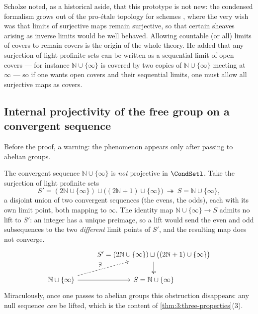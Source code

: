 \begin{remark}
\label{rmk:3:proetale-origin}
Scholze noted, as a historical aside, that this prototype is not new: the
condensed formalism grows out of the pro-\'etale topology for schemes
\cite{bhatt2014proetaletopologyschemes}, where the very wish was that limits of
surjective maps remain surjective, so that certain sheaves arising as inverse
limits would be well behaved. Allowing countable (or all) limits of covers to
remain covers is the origin of the whole theory. He added that any surjection of
light profinite sets can be written as a sequential limit of open covers --- for
instance $\mathbb{N}\cup\{\infty\}$ is covered by two copies of
$\mathbb{N}\cup\{\infty\}$ meeting at $\infty$ --- so if one wants open covers
and their sequential limits, one must allow all surjective maps as covers.
\end{remark}

\subsection{Internal projectivity of the free group on a convergent sequence}

Before the proof, a warning: the phenomenon appears only after passing to
abelian groups.

\begin{remark}
\label{rmk:3:seq-not-projective}
The convergent sequence $\mathbb{N}\cup\{\infty\}$ is \emph{not} projective in
$\CondSetl$. Take the surjection of light profinite sets
\begin{equation*}
S'=(2\mathbb{N}\cup\{\infty\})\sqcup\bigl((2\mathbb{N}+1)\cup\{\infty\}\bigr)
\ \twoheadrightarrow\ S=\mathbb{N}\cup\{\infty\},
\end{equation*}
a disjoint union of two convergent sequences (the evens, the odds), each with its
own limit point, both mapping to $\infty$. The identity map
$\mathbb{N}\cup\{\infty\}\to S$ admits no lift to $S'$: an integer has a unique
preimage, so a lift would send the even and odd subsequences to the two
\emph{different} limit points of $S'$, and the resulting map does not converge.
\[
\begin{tikzcd}
& S'=(2\mathbb{N}\cup\{\infty\})\sqcup\bigl((2\mathbb{N}+1)\cup\{\infty\}\bigr) \arrow[d, two heads] \\
\mathbb{N}\cup\{\infty\} \arrow[r] \arrow[ur, dashed, "\not\exists"] & S=\mathbb{N}\cup\{\infty\}
\end{tikzcd}
\]
Miraculously, once one passes to abelian groups this obstruction disappears: any
null sequence \emph{can} be lifted, which is the content of
\cref{thm:3:three-properties}(3).
\end{remark}

